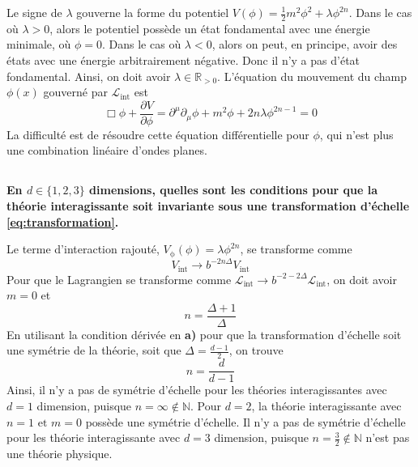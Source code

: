 \documentclass{article}
\numberwithin{equation}{section}
\theoremstyle{solution}
\begin{document}
\vspace{2ex}

Le signe de $\lambda $ gouverne la forme du potentiel $V(\phi) = \frac{1}{2}m^{2}\phi^{2} + \lambda \phi^{2n}$. 
Dans le cas où $\lambda > 0$, alors le potentiel possède un état fondamental avec une énergie minimale, où $\phi = 0$. 
Dans le cas où $\lambda < 0$, alors on peut, en principe, avoir des états avec une énergie arbitrairement négative.
Donc il n'y a pas d'état fondamental. Ainsi, on doit avoir $\lambda \in \mathbb{R}_{>0}$.
L'équation du mouvement du champ $\phi(x)$ gouverné par $\mathcal{L}_{\mathrm{int}}$ est
\begin{equation}
        \boxed{\Box\phi + \frac{\partial V}{\partial \phi} = \partial^\mu \partial_{\mu} \phi + m^2\phi + 2n\lambda \phi^{2n-1} = 0}
\end{equation} 
La difficulté est de résoudre cette équation différentielle pour $\phi$, qui n'est plus une combination linéaire d'ondes planes. 

\subsection{}
\textbf{En $d \in \{1,2,3\}$ dimensions, quelles sont les conditions pour que la théorie interagissante soit invariante
sous une transformation d’échelle \eqref{eq:transformation}.}
\vspace{2ex}

Le terme d'interaction rajouté, $V_{\mathrm{\phi}}(\phi) = \lambda \phi^{2n}$, se transforme comme
\begin{equation}
        V_{\mathrm{int}} \rightarrow b^{-2n\Delta}V_{\mathrm{int}}
\end{equation} 
Pour que le Lagrangien se transforme comme $\mathcal{L}_{\mathrm{int}} \rightarrow b^{-2-2\Delta}\mathcal{L}_{\mathrm{int}}$, on doit avoir $m=0$ et 
\begin{equation}
        n = \frac{\Delta + 1}{\Delta}
\end{equation} 
En utilisant la condition dérivée en \textbf{a)} pour que la transformation d'échelle soit une symétrie de la théorie, soit que $\Delta = \frac{d - 1}{2}$, on trouve
\begin{equation}
        n = \frac{d}{d - 1} 
\end{equation} 
Ainsi, il n'y a pas de symétrie d'échelle pour les théories interagissantes avec $d=1$ dimension, puisque $n = \infty \not\in \mathbb{N}$. 
Pour $d=2$, la théorie interagissante avec $\boxed{n=1 \text{ et } m=0}$ possède une symétrie d'échelle. 
Il n'y a pas de symétrie d'échelle pour les théorie interagissante avec $d=3$ dimension, puisque $n = \frac{3}{2} \not\in \mathbb{N}$ n'est pas 
une théorie physique.
\end{document}

